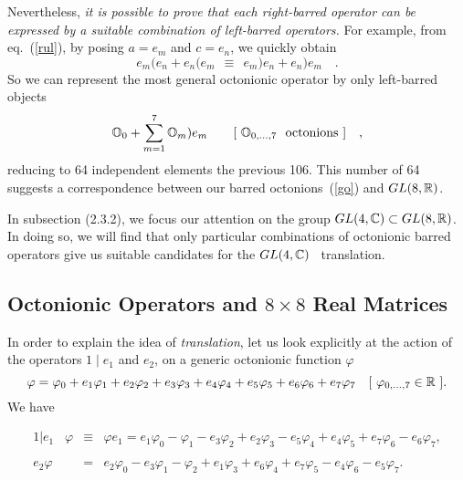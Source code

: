 \documentclass[a4paper,12pt]{book}
\begin{document}
Nevertheless, \emph{it is possible to prove that each right-barred operator
can be expressed by a suitable combination of left-barred operators.} For
example, from eq.~(\ref{rul}), by posing $a=e_{m}$ and $c=e_{n}$, we quickly
obtain 
\begin{equation}
e_{m}\mathbf{(}e_{n}+e_{n}\mathbf{(}e_{m}~~\equiv ~~e_{m}\mathbf{)}%
e_{n}+e_{n}\mathbf{)}e_{m}\quad .  \label{f1}
\end{equation}
So we can represent the most general octonionic operator by only left-barred
objects 
\begin{equation}
\Bbb{O}_{0}+\sum_{m=1}^{7}\Bbb{O}_{m}\mathbf{)}e_{m}\quad \quad [~\Bbb{O}%
_{0,...,7}~~\mbox{octonions}~]\quad ,  \label{go}
\end{equation}
reducing to 64 independent elements the previous 106. This number of 64
suggests a correspondence between our barred octonions~(\ref{go}) and $GL(8,%
\Bbb{R})$.

In subsection (2.3.2), we focus our attention on the group $GL(4,\Bbb{C}%
)\subset GL(8,\Bbb{R})$. In doing so, we will find that only particular
combinations of octonionic barred operators give us suitable candidates for
the $GL(4,\Bbb{C})$ \ translation.

\subsection{Octonionic Operators and $8\times 8$ Real Matrices}

In order to explain the idea of \emph{translation}, let us look explicitly
at the action of the operators $1\mid e_{1}$ and $e_{2}$, on a generic
octonionic function $\varphi $ 
\begin{equation}
\varphi =\varphi _{0}+e_{1}\varphi _{1}+e_{2}\varphi _{2}+e_{3}\varphi
_{3}+e_{4}\varphi _{4}+e_{5}\varphi _{5}+e_{6}\varphi _{6}+e_{7}\varphi
_{7}\quad [~\varphi _{0,\dots ,7}\in \Bbb{R}~].
\end{equation}
We have

\begin{eqnarray}
1|e_{1}\;\;\;\varphi &\equiv &\varphi e_{1}=e_{1}\varphi _{0}-\varphi
_{1}-e_{3}\varphi _{2}+e_{2}\varphi _{3}-e_{5}\varphi _{4}+e_{4}\varphi
_{5}+e_{7}\varphi _{6}-e_{6}\varphi _{7},  \nonumber \\
&&  \label{opa} \\
e_{2}\varphi &=&e_{2}\varphi _{0}-e_{3}\varphi _{1}-\varphi
_{2}+e_{1}\varphi _{3}+e_{6}\varphi _{4}+e_{7}\varphi _{5}-e_{4}\varphi
_{6}-e_{5}\varphi _{7}.  \nonumber \\
&&  \label{opa2}
\end{eqnarray}
\end{document}
